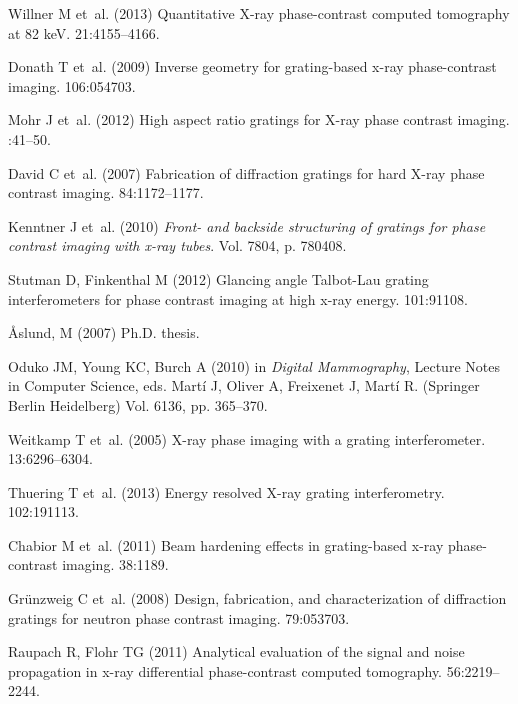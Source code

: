 \documentclass{pnastwo}
\begin{document}
\begin{article}
\begin{thebibliography}{10}
Willner M et~al. (2013) {Quantitative X-ray phase-contrast computed tomography
  at 82 keV}.
 21:4155--4166.

Donath T et~al. (2009) {Inverse geometry for grating-based x-ray phase-contrast
  imaging}.
 106:054703.

Mohr J et~al. (2012) {High aspect ratio gratings for X-ray phase contrast
  imaging}.
:41--50.

David C et~al. (2007) {Fabrication of diffraction gratings for hard X-ray phase
  contrast imaging}.
 84:1172--1177.

Kenntner J et~al. (2010) {\em {Front- and backside structuring of gratings for
  phase contrast imaging with x-ray tubes}}.
\newblock Vol.{} 7804, p. 780408.

Stutman D, Finkenthal M (2012) {Glancing angle Talbot-Lau grating
  interferometers for phase contrast imaging at high x-ray energy}.
 101:91108.

{\AA slund, M} (2007) Ph.D. thesis.

Oduko JM, Young KC, Burch A (2010) in {\em Digital Mammography}, Lecture Notes
  in Computer Science, eds.{} Martí J, Oliver A, Freixenet J, Martí R.
\newblock (Springer Berlin Heidelberg) Vol.{} 6136, pp. 365--370.

Weitkamp T et~al. (2005) {X-ray phase imaging with a grating interferometer}.
 13:6296--6304.

Thuering T et~al. (2013) {Energy resolved X-ray grating interferometry}.
 102:191113.

Chabior M et~al. (2011) {Beam hardening effects in grating-based x-ray
  phase-contrast imaging}.
 38:1189.

Gr\"{u}nzweig C et~al. (2008) {Design, fabrication, and characterization of
  diffraction gratings for neutron phase contrast imaging.}
 79:053703.

Raupach R, Flohr TG (2011) {Analytical evaluation of the signal and noise
  propagation in x-ray differential phase-contrast computed tomography.}
 56:2219--2244.


\end{thebibliography}
\end{article}
\end{document}
